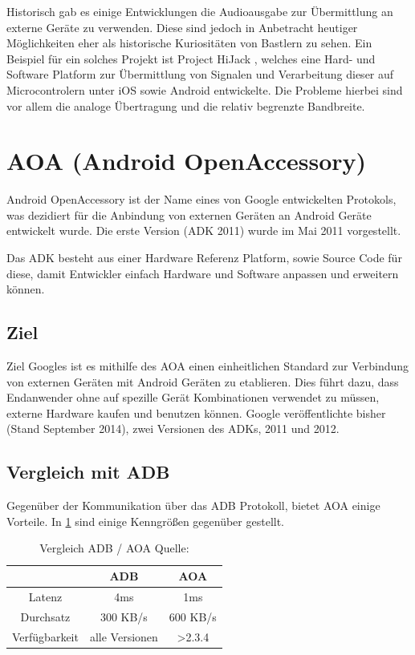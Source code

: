 \documentclass[12pt,journal,compsoc]{IEEEtran}
\begin{document}
Historisch gab es einige Entwicklungen die Audioausgabe zur Übermittlung an externe Geräte zu verwenden. Diese sind jedoch in Anbetracht heutiger Möglichkeiten eher als historische Kuriositäten von Bastlern zu sehen.
Ein Beispiel für ein solches Projekt ist Project HiJack \cite{hijack} , welches eine Hard- und Software Platform zur Übermittlung von Signalen und Verarbeitung dieser auf Microcontrolern unter iOS sowie Android entwickelte.
Die Probleme hierbei sind vor allem die analoge Übertragung und die relativ begrenzte Bandbreite.


\section{AOA (Android OpenAccessory)}
Android OpenAccessory ist der Name eines von Google entwickelten Protokols, was 
dezidiert für die Anbindung von externen Geräten an Android Geräte entwickelt wurde.
Die erste Version (ADK 2011) wurde im Mai 2011 vorgestellt.

Das ADK besteht aus einer Hardware Referenz Platform, sowie Source Code für diese, damit 
Entwickler einfach Hardware und Software anpassen und erweitern können.
\cite{developaoa}
\subsection{Ziel}
Ziel Googles ist es mithilfe des AOA einen einheitlichen Standard zur Verbindung von externen Geräten mit Android Geräten zu etablieren.
Dies führt dazu, dass Endanwender ohne auf spezille Gerät Kombinationen verwendet zu müssen, externe Hardware kaufen und benutzen können.
Google veröffentlichte bisher (Stand September 2014), zwei Versionen des ADKs, 2011 und 2012. 

\subsection{Vergleich mit ADB}
Gegenüber der Kommunikation über das ADB Protokoll, bietet AOA einige Vorteile. In \ref{table:vergl} sind einige Kenngrößen gegenüber gestellt.

\begin{table}
	\centering
	\caption{Vergleich ADB / AOA Quelle: \cite{comp}}
	\label{table:vergl}
	\begin{tabular}{c | c | c}
		& ADB & AOA \\ \hline
		Latenz & 4ms & 1ms \\ \hline
		Durchsatz & 300 KB/s & 600 KB/s \\ \hline
		Verfügbarkeit & alle Versionen & \textgreater 2.3.4 \\ \hline
	\end{tabular}
\end{table}
\end{document}
